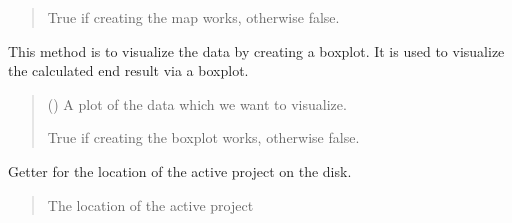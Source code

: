 \documentclass[letterpaper,10pt,english]{sphinxmanual}
\begin{document}
\begin{fulllineitems}
\begin{fulllineitems}
\begin{quote}
\begin{description}
\sphinxAtStartPar
True if creating the map works, otherwise false.

\sphinxAtStartPar
{}

\end{description}\end{quote}

\end{fulllineitems}


\begin{fulllineitems}
\label{\detokenize{apidoc/src.osm_configurator.model.project:src.osm_configurator.model.project.active_project.ActiveProject.create_boxplot}}
\pysigstartsignatures
{}
\pysigstopsignatures
\sphinxAtStartPar
This method is to visualize the data by creating a boxplot.
It is used to visualize the calculated end result via a boxplot.
\begin{quote}\begin{description}
\sphinxAtStartPar
{} () \textendash{} A plot of the data which we want to visualize.

\sphinxAtStartPar
True if creating the boxplot works, otherwise false.

\sphinxAtStartPar
{}

\end{description}\end{quote}

\end{fulllineitems}


\begin{fulllineitems}
\label{\detokenize{apidoc/src.osm_configurator.model.project:src.osm_configurator.model.project.active_project.ActiveProject.get_location}}
\pysigstartsignatures
{}
\pysigstopsignatures
\sphinxAtStartPar
Getter for the location of the active project on the disk.
\begin{quote}\begin{description}
\sphinxAtStartPar
The location of the active project


\end{description}
\end{quote}
\end{fulllineitems}
\end{fulllineitems}
\end{document}
